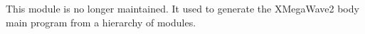 
This module is no longer maintained.
It used to generate the XMegaWave2 body main program 
from a hierarchy of modules.
